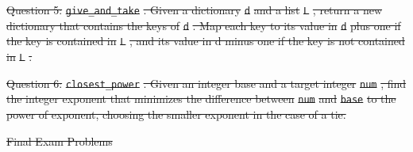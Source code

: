 \documentclass[12pt,twoside]{mitthesis}
\providecommand{\DIFdeltex}[1]{{\protect\color{red}\sout{#1}}}                      %
\providecommand{\DIFdel}[1]{\texorpdfstring{\DIFdeltex{#1}}{}} %
\begin{document}
\DIFdel{Question 5: }\texttt{\DIFdel{give\_and\_take}}%
\DIFdel{. Given a dictionary }\texttt{\DIFdel{d}} %
\DIFdel{and a list }\texttt{\DIFdel{L}}%
\DIFdel{, return a new dictionary that contains the keys of }\texttt{\DIFdel{d}}%
\DIFdel{. Map each key to its value in }\texttt{\DIFdel{d}} %
\DIFdel{plus one if the key is contained in }\texttt{\DIFdel{L}}%
\DIFdel{, and its value in d minus one if the key is not contained in }\texttt{\DIFdel{L}}%
\DIFdel{.
}%


\DIFdel{Question 6: }\texttt{\DIFdel{closest\_power}}%
\DIFdel{. Given an integer base and a target integer }\texttt{\DIFdel{num}}%
\DIFdel{, find the integer exponent that minimizes the difference between }\texttt{\DIFdel{num}} %
\DIFdel{and }\texttt{\DIFdel{base}} %
\DIFdel{to the power of exponent, choosing the smaller exponent in the case of a tie.
}%


\DIFdel{Final Exam Problems}%
\end{document}
